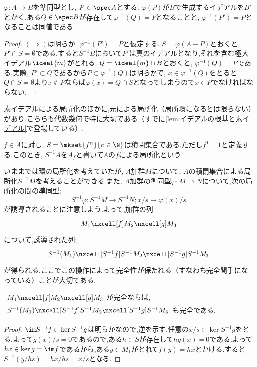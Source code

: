 \begin{prop}\label{prop:上にイデアルがあることの同値条件}
	$\varphi:A\to B$を準同型とし, $P\in\spec A$とする. $\varphi(P)$が$B$で生成するイデアルを$B'$とかく.ある$Q\in\spec B$が存在して$\varphi^{-1}(Q)=P$となることと, $\varphi^{-1}(P')=P$となることは同値である.
\end{prop}

\begin{proof}
	$(\Longrightarrow)$は明らか. $\varphi^{-1}(P')=P$と仮定する. $S=\varphi(A-P)$とおくと, $P'\cap S=\emptyset$である.すると$S^{-1}B$において$P'$は真のイデアルとなり,それを含む極大イデアル$\ideal{m}$がとれる. $Q=\ideal{m}\cap B$とおくと, $\varphi^{-1}(Q)=P$である.実際, $P'\subset Q$であるから$P\subset\varphi^{-1}(Q)$は明らかで, $x\in\varphi^{-1}(Q)$をとると$Q\cap S=\emptyset$より$x\not\in P$ならば$\varphi(x)=Q\cap S$となってしまうので$x\in P$でなければならない.
\end{proof}

素イデアルによる局所化のほかに,元による局所化（局所環になるとは限らない）があり,こちらも代数幾何で特に大切である（すでに\ref{lem:イデアルの根基と素イデアル}で登場している）.
\begin{defi}
	$f\in A$に対し, $S=\mkset{f^n}{n\in\N}$は積閉集合である.ただし$f^0=1$と定義する.このとき, $S^{-1}A$を$A_f$と書いて$A$の$f$による局所化という.	
\end{defi}

いままでは環の局所化を考えていたが, $A$加群$M$について, $A$の積閉集合による局所化$S^{-1}M$を考えることができる.また, $A$加群の準同型$\varphi:M\to N$について,次の局所化の間の準同型;
\[S^{-1}\varphi:S^{-1}M\to S^{-1}N;x/s\mapsto \varphi(x)/s\]
が誘導されることに注意しよう.よって,加群の列;
\[\begin{tikzcd}
	M_1\nxcell[f]M_2\nxcell[g]M_3
\end{tikzcd}\]
について,誘導された列;
\[\begin{tikzcd}
S^{-1}(M_1)\nxcell[S^{-1}f]S^{-1}M_2\nxcell[S^{-1}g]S^{-1}M_3
\end{tikzcd}\]
が得られる.ここでこの操作によって完全性が保たれる（すなわち完全関手になっている）ことが大切である.

\begin{prop}\label{prop:局所化は完全関手}
	$\begin{tikzcd}
	M_1\nxcell[f]M_2\nxcell[g]M_3
	\end{tikzcd}$が完全ならば, $\begin{tikzcd}
	S^{-1}(M_1)\nxcell[S^{-1}f]S^{-1}M_2\nxcell[S^{-1}g]S^{-1}M_3
	\end{tikzcd}$も完全である.
\end{prop}
\begin{proof}
	$\im S^{-1}f\subset\ker S^{-1}g$は明らかなので,逆を示す.任意の$x/s\in\ker S^{-1}g$をとる.よって$g(x)/s=0$であるので,ある$h\in S$が存在して$hg(x)=0$である.よって$hx\in\ker g=\im f$であるから,ある$y\in M_1$がとれて$f(y)=hx$とかける.すると$S^{-1}(y/hs)=hx/hs=x/s$となる.
\end{proof}

